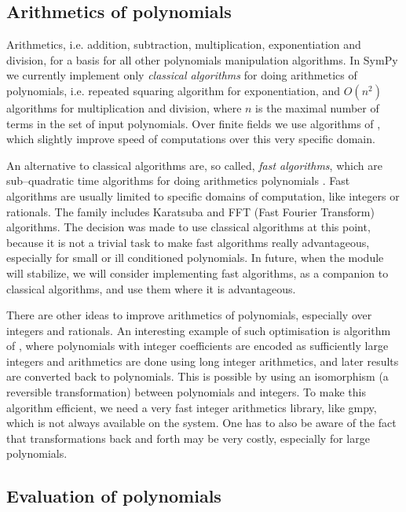 \subsection{Arithmetics of polynomials}

Arithmetics, i.e. addition, subtraction, multiplication, exponentiation and division, for a basis
for all other polynomials manipulation algorithms. In SymPy we currently implement only \emph{classical
algorithms} for doing arithmetics of polynomials, i.e. repeated squaring algorithm for exponentiation,
and $O(n^2)$ algorithms for multiplication and division, where $n$ is the maximal number of terms in
the set of input polynomials. Over finite fields we use algorithms of \cite{Monagan1993inplace}, which
slightly improve speed of computations over this very specific domain.

An alternative to classical algorithms are, so called, \emph{fast algorithms}, which are sub--quadratic
time algorithms for doing arithmetics polynomials \cite{Moenck1976practical}. Fast algorithms are usually
limited to specific domains of computation, like integers or rationals. The family includes Karatsuba
and FFT (Fast Fourier Transform) algorithms. The decision was made to use classical algorithms at this
point, because it is not a trivial task to make fast algorithms really advantageous, especially for
small or ill conditioned polynomials. In future, when the module will stabilize, we will consider
implementing fast algorithms, as a companion to classical algorithms, and use them where it is
advantageous.

There are other ideas to improve arithmetics of polynomials, especially over integers and rationals.
An interesting example of such optimisation is algorithm of \cite{Fateman2005encoding}, where polynomials
with integer coefficients are encoded as sufficiently large integers and arithmetics are done using
long integer arithmetics, and later results are converted back to polynomials. This is possible by
using an isomorphism (a reversible transformation) between polynomials and integers. To make this
algorithm efficient, we need a very fast integer arithmetics library, like gmpy, which is not always
available on the system. One has to also be aware of the fact that transformations back and forth
may be very costly, especially for large polynomials.


\subsection{Evaluation of polynomials}

